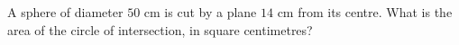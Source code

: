 A sphere of diameter $50$ cm is cut by a plane $14$ cm from its centre. What is the area of the circle of intersection, in square centimetres?
